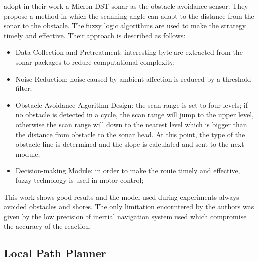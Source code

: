 \documentclass[12pt]{article}
\begin{document}
              \textcite{Conference2013} adopt in their work a Micron DST sonar as the obstacle avoidance sensor. They propose a method in which the scanning angle can adapt to the distance from the sonar to the obstacle. The fuzzy logic algorithms are used to make the strategy timely and effective. Their approach is described as follows:
                    \begin{itemize}
                          \item Data Collection and Pretreatment: interesting byte are extracted from the sonar packages to reduce computational complexity;
                          \item Noise Reduction: noise caused by ambient affection is reduced by a threshold filter;
                          \item Obstacle Avoidance Algorithm Design: the scan range is set to four levels; if no obstacle is detected in a cycle, the scan range will jump to the upper level, otherwise the scan range will down to the nearest level which is bigger than the distance from obstacle to the sonar head. At this point, the type of the obstacle line is determined and the slope is calculated and sent to the next module;
                          \item Decision-making Module: in order to make the route timely and effective, fuzzy technology is used in motor control;
                    \end{itemize}
              This work shows good results and the model used during experiments always avoided obstacles and shores. The only limitation encountered by the authors was given by the low precision of inertial navigation system used which compromise the accuracy of the reaction.

        \subsection{Local Path Planner} \label{lpp}
\end{document}
